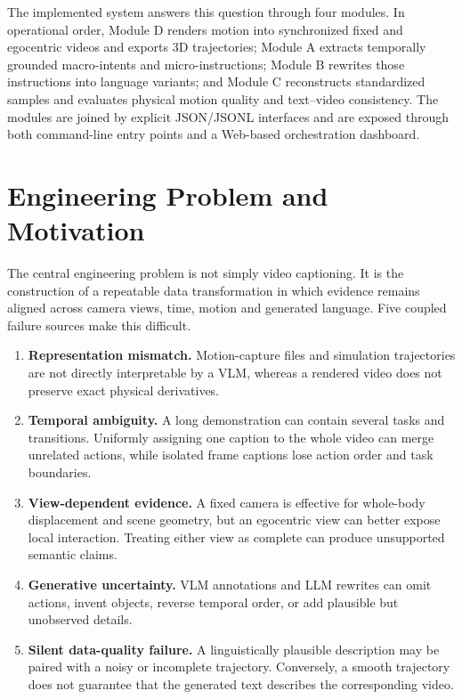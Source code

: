 \documentclass[11pt,oneside]{report}
\begin{document}
The implemented system answers this question through four modules. In
operational order, Module D renders motion into synchronized fixed and
egocentric videos and exports 3D trajectories; Module A extracts temporally
grounded macro-intents and micro-instructions; Module B rewrites those
instructions into language variants; and Module C reconstructs standardized
samples and evaluates physical motion quality and text--video consistency.
The modules are joined by explicit JSON/JSONL interfaces and are exposed through
both command-line entry points and a Web-based orchestration dashboard.

\section{Engineering Problem and Motivation}
The central engineering problem is not simply video captioning. It is the
construction of a repeatable data transformation in which evidence remains
aligned across camera views, time, motion and generated language. Five coupled
failure sources make this difficult.

\begin{enumerate}
    \item \textbf{Representation mismatch.} Motion-capture files and simulation
    trajectories are not directly interpretable by a VLM, whereas a rendered
    video does not preserve exact physical derivatives.
    \item \textbf{Temporal ambiguity.} A long demonstration can contain several
    tasks and transitions. Uniformly assigning one caption to the whole video
    can merge unrelated actions, while isolated frame captions lose action
    order and task boundaries.
    \item \textbf{View-dependent evidence.} A fixed camera is effective for
    whole-body displacement and scene geometry, but an egocentric view can
    better expose local interaction. Treating either view as complete can
    produce unsupported semantic claims.
    \item \textbf{Generative uncertainty.} VLM annotations and LLM rewrites can
    omit actions, invent objects, reverse temporal order, or add plausible but
    unobserved details.
    \item \textbf{Silent data-quality failure.} A linguistically plausible
    description may be paired with a noisy or incomplete trajectory.
    Conversely, a smooth trajectory does not guarantee that the generated text
    describes the corresponding video.
\end{enumerate}
\end{document}
